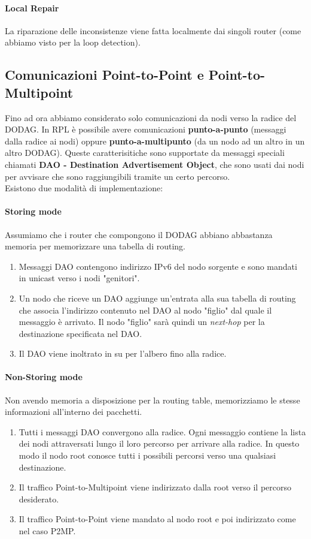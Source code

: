 \documentclass{article}
\begin{document}
\paragraph{Local Repair} La riparazione delle inconsistenze viene fatta localmente dai singoli router (come abbiamo visto per la loop detection).


\subsection{Comunicazioni Point-to-Point e Point-to-Multipoint}
Fino ad ora abbiamo considerato solo comunicazioni da nodi verso la radice del DODAG. In RPL è possibile avere comunicazioni \textbf{punto-a-punto} (messaggi dalla radice ai nodi) oppure \textbf{punto-a-multipunto} (da un nodo ad un altro in un altro DODAG). Queste caratterisitiche sono supportate da messaggi speciali chiamati \textbf{DAO - Destination Advertisement Object}, che sono usati dai nodi per avvisare che sono raggiungibili tramite un certo percorso.\\
Esistono due modalità di implementazione:
\paragraph{Storing mode} Assumiamo che i router che compongono il DODAG abbiano abbastanza memoria per memorizzare una tabella di routing.
\begin{enumerate}
    \item Messaggi DAO contengono indirizzo IPv6 del nodo sorgente e sono mandati in unicast verso i nodi "genitori".
    \item Un nodo che riceve un DAO aggiunge un'entrata alla sua tabella di routing che associa l'indirizzo contenuto nel DAO al nodo "figlio" dal quale il messaggio è arrivato. Il nodo "figlio" sarà quindi un \textit{next-hop} per la destinazione specificata nel DAO.
    \item Il DAO viene inoltrato in su per l'albero fino alla radice.
\end{enumerate}
\paragraph{Non-Storing mode} Non avendo memoria a disposizione per la routing table, memorizziamo le stesse informazioni all'interno dei pacchetti.
\begin{enumerate}
    \item Tutti i messaggi DAO convergono alla radice. Ogni messaggio contiene la lista dei nodi attraversati lungo il loro percorso per arrivare alla radice. In questo modo il nodo root conosce tutti i possibili percorsi verso una qualsiasi destinazione.
    \item Il traffico Point-to-Multipoint viene indirizzato dalla root verso il percorso desiderato.
    \item Il traffico Point-to-Point viene mandato al nodo root e poi indirizzato come nel caso P2MP.
\end{enumerate}
\end{document}

